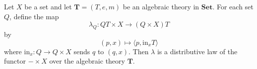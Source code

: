 Let $X$ be a set and let $\mathbf{T} = (T, e, m)$ be an algebraic theory in $\mathbf{Set}$. For each set $Q$, define the map
$$
\lambda_Q \colon QT \times X \longrightarrow (Q \times X)T
$$
by
$$
(p, x) \longmapsto \langle p, \mathrm{in}_x T \rangle
$$
where $\mathrm{in}_x \colon Q \longrightarrow Q \times X$ sends $q$ to $(q, x)$. Then $\lambda$ is a distributive law of the functor $- \times X$ over the algebraic theory $\mathbf{T}$.
